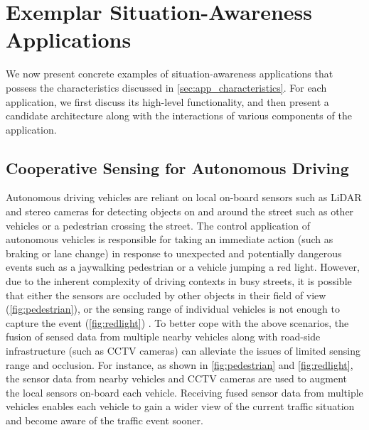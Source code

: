 \section{Exemplar Situation-Awareness Applications}
We now present concrete examples of situation-awareness applications that possess the characteristics discussed in \cref{sec:app_characteristics}. For each application, we first discuss its high-level functionality, and then present a candidate architecture along with the interactions of various components of the application. 
\subsection{Cooperative Sensing for Autonomous Driving}
Autonomous driving vehicles are reliant on local on-board sensors such as LiDAR and stereo cameras for detecting objects on and around the street such as other vehicles or a pedestrian crossing the street. The control application of autonomous vehicles is responsible for taking an immediate action (such as braking or lane change) in response to unexpected and potentially dangerous events such as a jaywalking pedestrian or a vehicle jumping a red light. However, due to the inherent complexity of driving contexts in busy streets, it is possible that either the sensors are occluded by other objects in their field of view (\cref{fig:pedestrian}), or the sensing range of individual vehicles is not enough to capture the event (\cref{fig:redlight}) \cite{fusioneye}. To better cope with the above scenarios, the fusion of sensed data from multiple nearby vehicles along with road-side infrastructure (such as CCTV cameras) can alleviate the issues of limited sensing range and occlusion. For instance, as shown in \cref{fig:pedestrian} and \cref{fig:redlight}, the sensor data from nearby vehicles and CCTV cameras are used to augment the local sensors on-board each vehicle. Receiving fused sensor data from multiple vehicles enables each vehicle to gain a wider view of the current traffic situation and become aware of the traffic event sooner.
